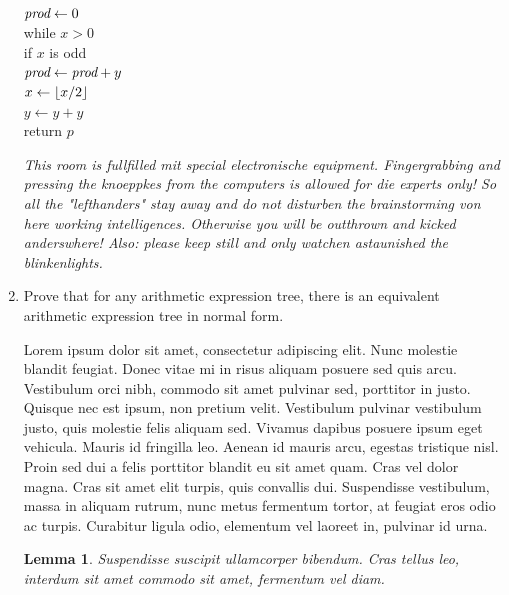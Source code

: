 \documentclass[11pt]{article}
\newtheorem{lemma}{Lemma}
\begin{document}
\begin{enumerate}
\begin{solution}
\begin{center}\small
\begin{algorithm}
\+
\\	$\emph{prod}\gets 0$
\\	while $x > 0$\+
\\		if $x$ is odd\+
\\			$\emph{prod} \gets \emph{prod} +y$\-
\\		$x \gets \lfloor x/2 \rfloor$
\\		$y \gets y+y$\-
\\	return $p$
\end{algorithm}
\end{center}

\emph{This room is fullfilled mit special electronische equipment. Fingergrabbing and pressing the knoeppkes from the computers is allowed for die experts only! So all the "lefthanders" stay away and do not disturben the brainstorming von here working intelligences. Otherwise you will be outthrown and kicked anderswhere! Also: please keep still and only watchen astaunished the blinkenlights. }
\end{solution}

\newpage
\item
Prove that for any arithmetic expression tree, there is an equivalent arithmetic expression tree in normal form.


\begin{solution}
Lorem ipsum dolor sit amet, consectetur adipiscing elit. Nunc molestie blandit feugiat. Donec vitae mi in risus aliquam posuere sed quis arcu. Vestibulum orci nibh, commodo sit amet pulvinar sed, porttitor in justo. Quisque nec est ipsum, non pretium velit. Vestibulum pulvinar vestibulum justo, quis molestie felis aliquam sed. Vivamus dapibus posuere ipsum eget vehicula. Mauris id fringilla leo. Aenean id mauris arcu, egestas tristique nisl. Proin sed dui a felis porttitor blandit eu sit amet quam. Cras vel dolor magna. Cras sit amet elit turpis, quis convallis dui. Suspendisse vestibulum, massa in aliquam rutrum, nunc metus fermentum tortor, at feugiat eros odio ac turpis. Curabitur ligula odio, elementum vel laoreet in, pulvinar id urna.

\begin{lemma}
Suspendisse suscipit ullamcorper bibendum. Cras tellus leo, interdum sit amet commodo sit amet, fermentum vel diam.
\end{lemma}


\end{solution}
\end{enumerate}
\end{document}
